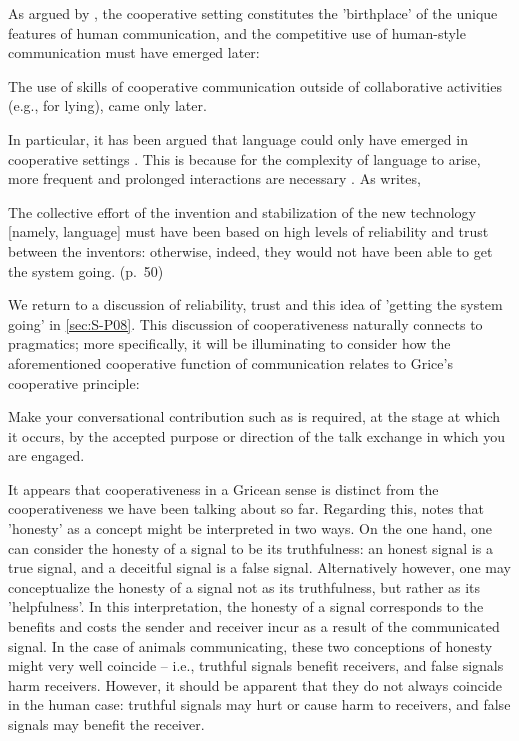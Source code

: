 As argued by \citet{Tomasello08, Tomasello09}, the cooperative setting constitutes the 'birthplace' of the unique features of human communication, and the competitive use of human-style communication must have emerged later:
\begin{quoting}
    The use of skills of cooperative communication outside of collaborative activities (e.g., for lying), came only later.
    \\ \hspace*{\fill} \citep[p.~325]{Tomasello08}
\end{quoting}
In particular, it has been argued that language could only have emerged in cooperative settings \citep{Tomasello08, Dor17}.
This is because for the complexity of language to arise, more frequent and prolonged interactions are necessary \citep{Benitez21}. As \citet{Dor17} writes,
\begin{quoting}
    The collective effort of the invention and stabilization of the new technology [namely, language] must have been based on high levels of reliability and trust between the inventors: otherwise, indeed, they would not have been able to get the system going.
    \hfill (p.~50)
\end{quoting}
We return to a discussion of reliability, trust and this idea of 'getting the system going' in \cref{sec:S-P08}.
This discussion of cooperativeness naturally connects to pragmatics; more specifically, it will be illuminating to consider how the aforementioned cooperative function of communication relates to Grice's cooperative principle:
\begin{quoting}
    Make your conversational contribution such as is required, at the stage at which it occurs, by the accepted purpose or direction of the talk exchange in which you are engaged.
    \hfill \citep[p.~45]{Grice75}
\end{quoting}
It appears that cooperativeness in a Gricean sense is distinct from the cooperativeness we have been talking about so far.
Regarding this, \citet{Dor17} notes that 'honesty' as a concept might be interpreted in two ways. On the one hand, one can consider the honesty of a signal to be its truthfulness: an honest signal is a true signal, and a deceitful signal is a false signal. Alternatively however, one may conceptualize the honesty of a signal not as its truthfulness, but rather as its 'helpfulness'. In this interpretation, the honesty of a signal corresponds to the benefits and costs the sender and receiver incur as a result of the communicated signal. In the case of animals communicating, these two conceptions of honesty might very well coincide -- i.e., truthful signals benefit receivers, and false signals harm receivers. However, it should be apparent that they do not always coincide in the human case: truthful signals may hurt or cause harm to receivers, and false signals may benefit the receiver.

